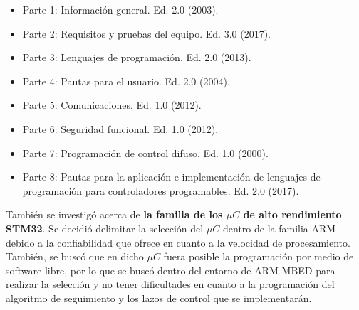\begin{itemize}
	\item Parte 1: Información general. Ed. 2.0 (2003). %
	\item Parte 2: Requisitos y pruebas del equipo. Ed. 3.0 (2017). %
	\item Parte 3: Lenguajes de programación. Ed. 2.0 (2013). %
	\item Parte 4: Pautas para el usuario. Ed. 2.0 (2004). %
	\item Parte 5: Comunicaciones. Ed. 1.0 (2012). %
	\item Parte 6: Seguridad funcional. Ed. 1.0 (2012). %
	\item Parte 7: Programación de control difuso. Ed. 1.0 (2000). %
	\item Parte 8: Pautas para la aplicación e implementación de lenguajes de programación para controladores programables. Ed. 2.0 (2017). %
\end{itemize}

También se investigó acerca de \textbf{la familia de los $ \mu C $ de alto rendimiento STM32}. Se decidió delimitar la selección del $ \mu C $ dentro de la familia ARM debido a la confiabilidad que ofrece en cuanto a la velocidad de procesamiento. También, se buscó que en dicho $ \mu C $ fuera posible la programación por medio de software libre, por lo que se buscó dentro del entorno de ARM MBED para realizar la selección y no tener dificultades en cuanto a la programación del algoritmo de seguimiento y los lazos de control que se implementarán. \\

